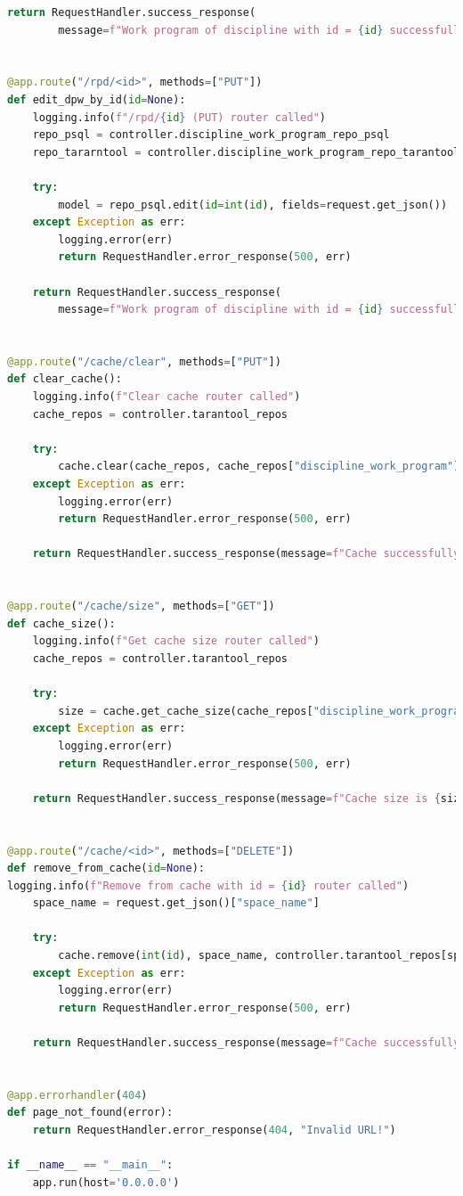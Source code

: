 \begin{lstlisting}[label=lst:app, caption=Листинг взаимодействия клиента с сервером, language=python]
	return RequestHandler.success_response(
		message=f"Work program of discipline with id = {id} successfully deleted")


@app.route("/rpd/<id>", methods=["PUT"])
def edit_dpw_by_id(id=None):
	logging.info(f"/rpd/{id} (PUT) router called")
	repo_psql = controller.discipline_work_program_repo_psql
	repo_tararntool = controller.discipline_work_program_repo_tarantool
	
	try:
		model = repo_psql.edit(id=int(id), fields=request.get_json())
	except Exception as err:
		logging.error(err)
		return RequestHandler.error_response(500, err)
	
	return RequestHandler.success_response(
		message=f"Work program of discipline with id = {id} successfully changed")


@app.route("/cache/clear", methods=["PUT"])
def clear_cache():
	logging.info(f"Clear cache router called")
	cache_repos = controller.tarantool_repos
	
	try:
		cache.clear(cache_repos, cache_repos["discipline_work_program"].connection)
	except Exception as err:
		logging.error(err)
		return RequestHandler.error_response(500, err)
	
	return RequestHandler.success_response(message=f"Cache successfully cleared")


@app.route("/cache/size", methods=["GET"])
def cache_size():
	logging.info(f"Get cache size router called")
	cache_repos = controller.tarantool_repos

	try:
		size = cache.get_cache_size(cache_repos["discipline_work_program"].connection)
	except Exception as err:
		logging.error(err)
		return RequestHandler.error_response(500, err)
	
	return RequestHandler.success_response(message=f"Cache size is {size}")


@app.route("/cache/<id>", methods=["DELETE"])
def remove_from_cache(id=None):
logging.info(f"Remove from cache with id = {id} router called")
	space_name = request.get_json()["space_name"]
	
	try:
		cache.remove(int(id), space_name, controller.tarantool_repos[space_name])
	except Exception as err:
		logging.error(err)
		return RequestHandler.error_response(500, err)

	return RequestHandler.success_response(message=f"Cache successfully cleared")


@app.errorhandler(404)
def page_not_found(error):
	return RequestHandler.error_response(404, "Invalid URL!")

if __name__ == "__main__":
	app.run(host='0.0.0.0')
\end{lstlisting}

